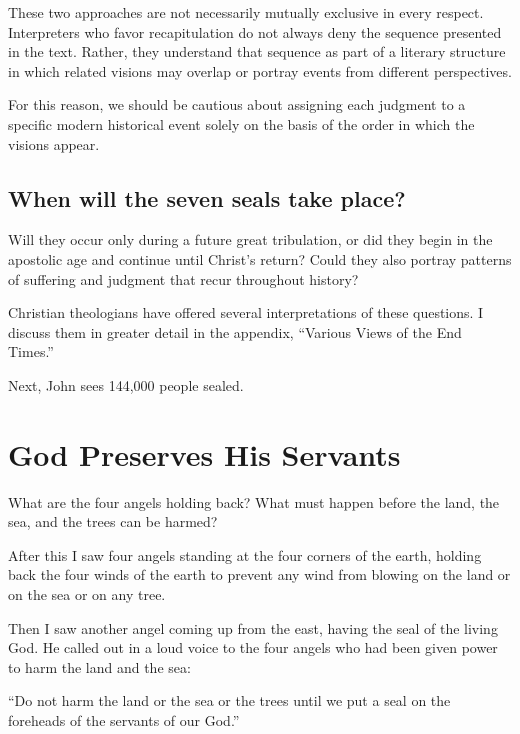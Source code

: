 \begin{InDepth}
These two approaches are not necessarily mutually exclusive in every respect. Interpreters who favor recapitulation do not always deny the sequence presented in the text. Rather, they understand that sequence as part of a literary structure in which related visions may overlap or portray events from different perspectives.

For this reason, we should be cautious about assigning each judgment to a specific modern historical event solely on the basis of the order in which the visions appear.
\end{InDepth}

\subsection{When will the seven seals take place?}
Will they occur only during a future great tribulation, or did they begin in the apostolic age and continue until Christ's return? Could they also portray patterns of suffering and judgment that recur throughout history?

Christian theologians have offered several interpretations of these questions. I discuss them in greater detail in the appendix, ``Various Views of the End Times.''

Next, John sees 144,000 people sealed.

\section{God Preserves His Servants}


\begin{ScriptureBox2}{What are the four angels holding back? What must happen before the land, the sea, and the trees can be harmed?}

\item[7:1] After this I saw four angels standing at the four corners of the earth, holding back the four winds of the earth to prevent any wind from blowing on the land or on the sea or on any tree.

\item[7:2] Then I saw another angel coming up from the east, having the seal of the living God. He called out in a loud voice to the four angels who had been given power to harm the land and the sea:

\item[7:3] ``Do not harm the land or the sea or the trees until we put a seal on the foreheads of the servants of our God.''

\end{ScriptureBox2}

